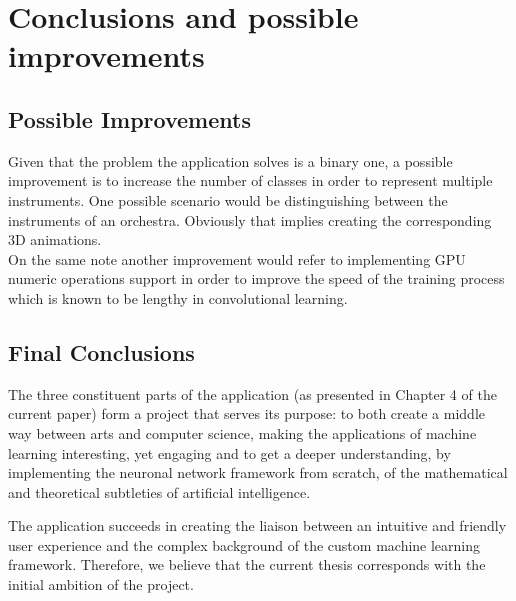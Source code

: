 \chapter*{Conclusions and possible improvements}
\section*{Possible Improvements}
Given that the problem the application solves is a binary one, a possible improvement is to increase
the number of classes in order to represent multiple instruments.
One possible scenario would be distinguishing between the instruments of an orchestra.
Obviously that implies creating the corresponding 3D animations.\\
On the same note another improvement would refer to implementing GPU numeric operations support in
order to improve the speed of the training process which is known to be lengthy in
convolutional learning.
\section*{Final Conclusions}
The three constituent parts of the application (as presented in Chapter 4 of the current paper) form a project that serves its purpose: to both create a middle way between arts and computer science, making the applications of machine learning interesting, yet engaging and to get  a deeper understanding, by implementing the neuronal network framework from scratch, of the mathematical and theoretical subtleties of artificial intelligence.

		The application succeeds in creating the liaison between an intuitive and friendly user experience and the complex background of the custom machine learning framework. Therefore, we believe that the current thesis corresponds with the initial ambition of the project.
